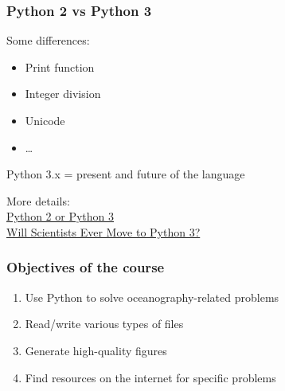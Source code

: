 \begin{frame}[fragile]
\frametitle{Python 2 vs Python 3}

Some differences:
\begin{itemize}
\item Print function
\item Integer division
\item Unicode
\item \ldots
\end{itemize}

Python 3.x = present and future of the language

\vfill

More details:\\
\href{https://wiki.python.org/moin/Python2orPython3}{Python 2 or Python 3}\\
\href{https://jakevdp.github.io/blog/2013/01/03/will-scientists-ever-move-to-python-3/}{Will Scientists Ever Move to Python 3?}

\end{frame}



\begin{frame}[fragile]
\frametitle{Objectives of the course}

\begin{enumerate}
\item<1-> Use Python to solve oceanography-related problems
\item<2-> Read/write various types of files
\item<3-> Generate high-quality figures
\item<4-> Find resources on the internet for specific problems
\end{enumerate}

\vspace{.5cm}


\end{frame}


